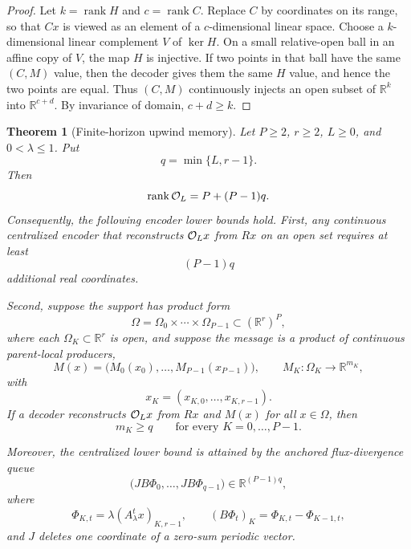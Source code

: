 \documentclass[preprint,12pt]{elsarticle}
\theoremstyle{plain}
\newtheorem{theorem}{Theorem}
\theoremstyle{remark}
\theoremstyle{definition}
\newcommand{\R}{\mathbb R}
\DeclareMathOperator{\rank}{rank}
\begin{document}
\begin{proof}
Let \(k=\rank H\) and \(c=\rank C\).  Replace \(C\) by coordinates on its
range, so that \(Cx\) is viewed as an element of a \(c\)-dimensional linear
space.  Choose a \(k\)-dimensional linear complement \(V\) of \(\ker H\).  On
a small relative-open ball in an affine copy of \(V\), the map \(H\) is
injective.  If two points in that ball have the same \((C,M)\) value, then
the decoder gives them the same \(H\) value, and hence the two points are
equal.  Thus \((C,M)\) continuously injects an open subset of \(\mathbb R^k\) into \(\mathbb R^{c+d}\).  By invariance of domain, \(c+d\ge k\).
\end{proof}

\begin{theorem}[Finite-horizon upwind memory]
\label{thm:rank}
Let \(P\ge2\), \(r\ge2\), \(L\ge0\), and \(0<\lambda\le1\).  Put
\[
  q=\min\{L,r-1\}.
\]
Then
\[
  \rank {\cal O}_L
  =
  P+(P-1)q.
\]
Consequently, the following encoder lower bounds hold.  First, any
continuous centralized encoder that reconstructs \({\cal O}_Lx\) from \(Rx\)
on an open set requires at least
\[
  (P-1)q
\]
additional real coordinates.

Second, suppose the support has product form
\[
  \Omega=\Omega_0\times\cdots\times\Omega_{P-1}
  \subset (\mathbb R^r)^P,
\]
where each \(\Omega_K\subset\mathbb R^r\) is open, and suppose the message is
a product of continuous parent-local producers,
\[
  M(x)=\bigl(M_0(x_0),\ldots,M_{P-1}(x_{P-1})\bigr),
  \qquad
  M_K:\Omega_K\to\mathbb R^{m_K},
\]
with
\[
  x_K=(x_{K,0},\ldots,x_{K,r-1}).
\]
If a decoder reconstructs \({\cal O}_Lx\) from \(Rx\) and \(M(x)\) for all
\(x\in\Omega\), then
\[
  m_K\ge q
  \qquad
  \text{for every }K=0,\ldots,P-1.
\]

Moreover, the centralized lower bound is attained by the anchored flux-divergence queue
\[
  \bigl(JB\Phi_0,\ldots,JB\Phi_{q-1}\bigr)
  \in\R^{(P-1)q},
\]
where
\[
  \Phi_{K,t}=\lambda(A_\lambda^t x)_{K,r-1},
  \qquad
  (B\Phi_t)_K=\Phi_{K,t}-\Phi_{K-1,t},
\]
and \(J\) deletes one coordinate of a zero-sum periodic vector.
\end{theorem}
\end{document}
